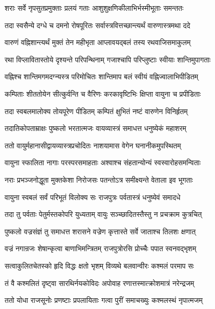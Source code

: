\twolineshloka
{शराः सर्वे नृपसुतप्रमुक्ताः प्रलयं गताः}
{आशुशुक्षणिकीलाभिर्भस्मीभूताः समन्ततः}%

\twolineshloka
{तदा स्वसैन्ये दग्धे च दमनो रोषपूरितः}
{सर्वास्त्रवित्तच्छान्त्यर्थं वारुणास्त्रमथा ददे}%

\twolineshloka
{वारुणं वह्निशान्त्यर्थं मुक्तं तेन महीभृता}
{आप्लावयद्बलं तस्य रथवाजिसमाकुलम्}%

\twolineshloka
{रथा विप्लावितास्तोये दृश्यन्ते परिपन्थिनाम्}
{गजाश्चापि परिप्लुष्टाः स्वीयाः शान्तिमुपागताः}%

\twolineshloka
{वह्निश्च शान्तिमगमदग्न्यस्त्र परिमोचितः}
{शान्तिमाप बलं स्वीयं वह्निज्वालाभिपीडितम्}%

\twolineshloka
{कम्पिताः शीततोयेन सीत्कुर्वन्ति च वैरिणः}
{करकावृष्टिभिः क्षिप्ता वायुना च प्रपीडिताः}%

\twolineshloka
{तदा स्वबलमालोक्य तोयपूरेण पीडितम्}
{कम्पितं क्षुभितं नष्टं वारुणेन विनिर्हृतम्}%

\twolineshloka
{तदातिकोपताम्राक्षः पुष्कलो भरतात्मजः}
{वायव्यास्त्रं समाधत्त धनुष्येकं महाशरम्}%

\twolineshloka
{ततो वायुर्महानासीद्वायव्यास्त्रप्रचोदितः}
{नाशयामास वेगेन घनानीकमुपस्थितम्}%

\twolineshloka
{वायुना स्फालिता नागाः परस्परसमाहताः}
{अश्वाश्च संहतान्योन्यं स्वस्वारोहसमन्विताः}%

\twolineshloka
{नराः प्रभञ्जनोद्धूता मुक्तकेशा निरोजसः}
{पतन्तोऽत्र समीक्ष्यन्ते वेताला इव भूगताः}%

\twolineshloka
{वायुना स्वबलं सर्वं परिभूतं विलोक्य सः}
{राजपुत्रः पर्वतास्त्रं धनुष्येवं समादधे}%

\twolineshloka
{तदा तु पर्वताः पेतुर्मस्तकोपरि युध्यताम्}
{वायुः सञ्च्छादितस्तैस्तु न प्रचक्राम कुत्रचित्}%

\twolineshloka
{पुष्कलो वज्रसंज्ञं तु समाधत्त शरासने}
{वज्रेण कृत्तास्ते सर्वे जाताश्च तिलशः क्षणात्}%

\twolineshloka
{वज्रं नगान्रजः शेषान्कृत्वा बाणाभिमन्त्रितम्}
{राजपुत्रोरसि प्रोच्चैः पपात स्वनवद्भृशम्}%

\twolineshloka
{सत्वाकुलितचेतस्को हृदि विद्धः क्षतो भृशम्}
{विव्यथे बलवान्वीरः कश्मलं परमाप सः}%

\twolineshloka
{तं वै कश्मलितं दृष्ट्वा सारथिर्नयकोविदः}
{अपोवाह रणात्तस्मात्क्रोशमात्रं नरेन्द्रजम्}%

\twolineshloka
{ततो योधा राजसूनोः प्रणष्टाः प्रपलायिताः}
{गत्वा पुरीं समाचख्युः कश्मलस्थं नृपात्मजम्}%

